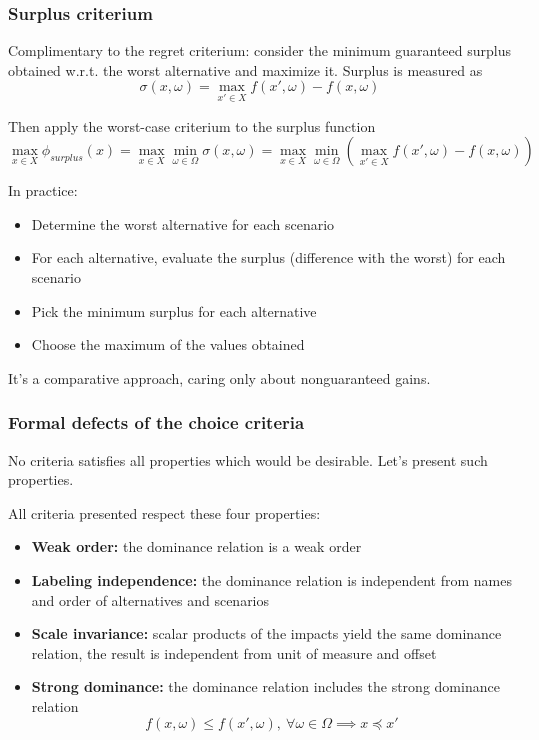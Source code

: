 \subsubsection{Surplus criterium}

Complimentary to the regret criterium: consider the minimum guaranteed surplus obtained w.r.t. the worst alternative and maximize it. Surplus is measured as
$$ \sigma (x, \omega) = \max_{x' \in X} f(x', \omega) - f(x, \omega) $$

Then apply the worst-case criterium to the surplus function
$$ \max_{x \in X} \phi_{surplus} (x) = \max_{x \in X} \min_{\omega \in \Omega} \sigma (x, \omega) = \max_{x \in X} \min_{\omega \in \Omega} \left(\max_{x' \in X} f(x', \omega) - f(x, \omega) \right)$$

In practice: 
\begin{itemize}
	\item Determine the worst alternative for each scenario
	
	\item For each alternative, evaluate the surplus (difference with the worst) for each scenario
	
	\item Pick the minimum surplus for each alternative
	
	\item Choose the maximum of the values obtained
\end{itemize}

It's a comparative approach, caring only about nonguaranteed gains.

\subsubsection{Formal defects of the choice criteria}

No criteria satisfies all properties which would be desirable. Let's present such properties. 

All criteria presented respect these four properties: 
\begin{itemize}
	\item \textbf{Weak order:} the dominance relation is a weak order
	
	\item \textbf{Labeling independence:} the dominance relation is independent from names and order of alternatives and scenarios
	
	\item \textbf{Scale invariance:} scalar products of the impacts yield the same dominance relation, the result is independent from unit of measure and offset 
	
	\item \textbf{Strong dominance:} the dominance relation includes the strong dominance relation 
	$$ f(x, \omega) \leq f (x', \omega) , \ \forall \omega \in \Omega \implies x \preceq x' $$
\end{itemize}

